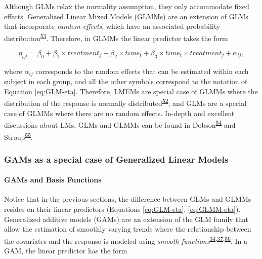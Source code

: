 \documentclass[
]{article}
\begin{document}
Although GLMs relax the normality assumption, they only accommodate fixed effects. Generalized Linear Mixed Models (GLMMs) are an extension of GLMs that incorporate \emph{random effects}, which have an associated probability distribution\textsuperscript{\protect\hyperlink{ref-mcculloch2001}{53}}. Therefore, in GLMMs the linear predictor takes the form

\begin{equation}
\eta_{ijt}=\beta_0+\beta_1 \times treatment_{j} + \beta_2 \times time_{t} +\beta_3 \times time_{t}\times treatment_{j}+\alpha_{ij},
\label{eq:GLMM-eta}
\end{equation}

where \(\alpha_{ij}\) corresponds to the random effects that can be estimated within each subject in each group, and all the other symbols correspond to the notation of Equation \eqref{eq:GLM-eta}. Therefore, LMEMs are special case of GLMMs where the distribution of the response is normally distributed\textsuperscript{\protect\hyperlink{ref-nelder1972}{52}}, and GLMs are a special case of GLMMs where there are no random effects. In-depth and excellent discussions about LMs, GLMs and GLMMs can be found in Dobson\textsuperscript{\protect\hyperlink{ref-dobson2008}{54}} and Stroup\textsuperscript{\protect\hyperlink{ref-stroup2013}{55}}.

\hypertarget{GAM-theory}{%
\subsubsection{GAMs as a special case of Generalized Linear Models}\label{GAM-theory}}

\hypertarget{gams-and-basis-functions}{%
\paragraph{GAMs and Basis Functions}\label{gams-and-basis-functions}}

Notice that in the previous sections, the difference between GLMs and GLMMs resides on their linear predictors (Equations \eqref{eq:GLM-eta}, \eqref{eq:GLMM-eta}). Generalized additive models (GAMs) are an extension of the GLM family that allow the estimation of smoothly varying trends where the relationship between the covariates and the response is modeled using \emph{smooth functions}\textsuperscript{\protect\hyperlink{ref-simpson2018}{34},\protect\hyperlink{ref-wood2017}{37},\protect\hyperlink{ref-hastie1987}{56}}. In a GAM, the linear predictor has the form
\end{document}
